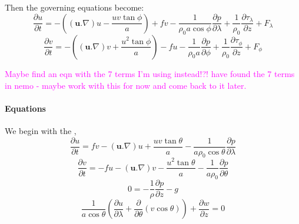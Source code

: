 \documentclass[..\EOYR.tex]{subfiles}
\begin{document}
Then the governing equations become:
\begin{equation} \label{PrimMomUMB}
    \frac{\partial u}{\partial t}=-\left(\left(\mathbf{u}.\nabla\right)u - \frac{uv\tan \phi }{a}\right) + fv - \frac{1}{\rho_0 a \cos \phi}\frac{\partial p}{\partial \lambda} + \frac{1}{\rho_0}\frac{\partial \tau_\lambda}{\partial z} + F_\lambda
\end{equation}
\begin{equation} \label{PrimMomVMB}
    \frac{\partial v}{\partial t}=-\left(\left(\mathbf{u}.\nabla\right)v + \frac{u^2\tan \phi }{a}\right) - fu - \frac{1}{\rho_0 a}\frac{\partial p}{\partial \phi} + \frac{1}{\rho_0}\frac{\partial \tau_\phi}{\partial z} + F_\phi
\end{equation}

\textcolor{magenta}{Maybe find an eqn with the 7 terms I'm using instead!?! have found the 7 terms in nemo - maybe work with this for now and come back to it later.}




\paragraph{Equations}
We begin with the ,
\begin{equation}\label{PrimMomU}
    \frac{\partial u}{\partial t}=fv - \left(\mathbf{u}.\nabla\right)u + \frac{uv\tan \theta }{a} - \frac{1}{a\rho_0\cos \theta}\frac{\partial p}{\partial \lambda}
\end{equation}
\begin{equation}\label{PrimMomV}
    \frac{\partial v}{\partial t}=-fu - \left(\mathbf{u}.\nabla\right)v - \frac{u^2\tan \theta }{a} - \frac{1}{a\rho_0}\frac{\partial p}{\partial \theta}
\end{equation}
\begin{equation}\label{PrimMomW}
    0=-\frac{1}{\rho}\frac{\partial p}{\partial z} - g
\end{equation}
\begin{equation}\label{PrimMassCont}
    \frac{1}{a\cos\theta}\left(\frac{\partial u}{\partial\lambda}+\frac{\partial}{\partial\theta}\left(v\cos\theta\right)\right)+\frac{\partial w}{\partial z} = 0
\end{equation}
\end{document}
